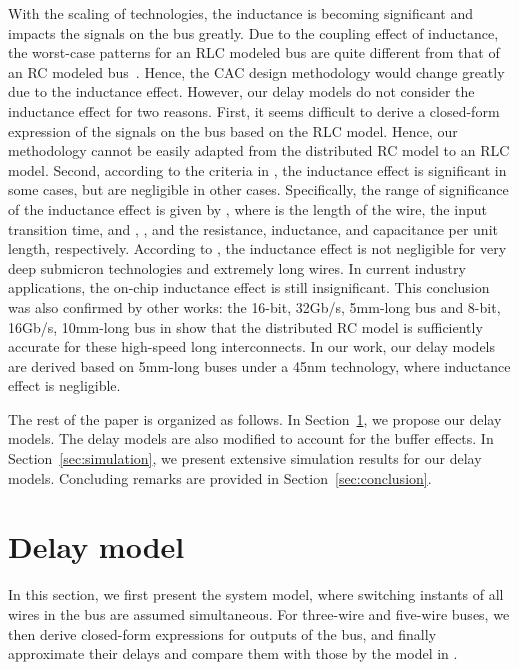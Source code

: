 \documentclass[10pt,journal]{IEEEtran}
\begin{document}
With the scaling of technologies, the inductance is becoming significant and impacts the signals on the bus greatly. Due to the coupling effect of inductance, the worst-case patterns for an RLC modeled bus are quite different from that of an RC modeled bus~\cite{Tu06}. Hence, the CAC design methodology would change greatly due to the inductance effect.
However, our delay models do not consider the inductance effect  for two reasons.
First, it seems difficult to derive a closed-form expression of the signals on the bus based on the RLC model. Hence, our methodology cannot be easily adapted from the distributed RC model to an RLC model. Second, according to the criteria in \cite{Ism99}, the inductance effect is significant in some cases, but are negligible in other cases. Specifically, the range of significance of the inductance effect is given by  \cite{Ism99}, where  is the length of the wire,  the input transition time, and , , and  the resistance, inductance, and capacitance per unit length, respectively.
According to \cite{CSLJ_JLPE08}, the inductance effect is not negligible for very deep submicron technologies and extremely long wires.
In current industry applications, the on-chip inductance effect is still insignificant. This conclusion was also confirmed by other works: the 16-bit, 32Gb/s, 5mm-long bus and 8-bit, 16Gb/s, 10mm-long bus in \cite{Zha09} show that the distributed RC model is sufficiently accurate for these high-speed long interconnects. In our work, our delay models are derived based on 5mm-long buses under a 45nm technology, where inductance effect is negligible.














The rest of the paper is organized as follows. In Section~\ref{sec:model}, we propose our delay models. The delay models are also modified to account for the buffer effects.
In Section~\ref{sec:simulation}, we present extensive simulation results for our delay models. Concluding remarks are provided in Section~\ref{sec:conclusion}.

\section{Delay model}
\label{sec:model}

In this section, we first present the system model, where switching instants of all wires in the bus are assumed simultaneous. For three-wire and five-wire buses, we then derive closed-form expressions for outputs of the bus, and finally approximate their delays and compare them with those by the model in \cite{Sot01}.
\end{document}
